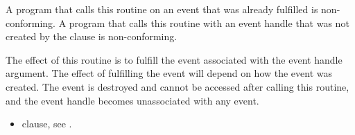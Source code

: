 \constraints

A program that calls this routine on an event that was already fulfilled is non-conforming.
A program that calls this routine with an event handle that was not created by the  clause is non-conforming.

\effect

The effect of this routine is to fulfill the event associated with the event handle argument. The effect of fulfilling the event will depend on how the event was created. The event is destroyed and cannot be accessed after calling this routine, and the event handle becomes unassociated with any event.

\crossreferences

\begin{itemize}
 \item {} clause, see .
\end{itemize}
